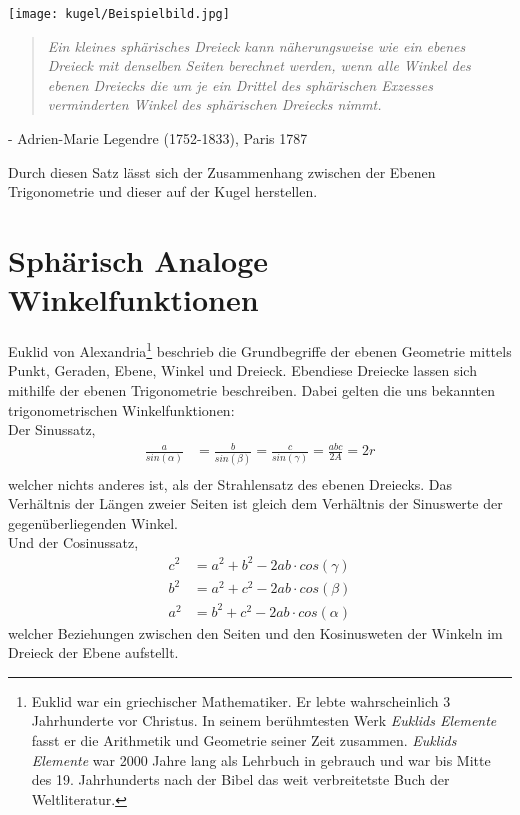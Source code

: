 \begin{refsection}
\begin{refsection}
\begin{center}
        \texttt{[image: kugel/Beispielbild.jpg]}
\end{center}

\begin{quote} \textit{Ein kleines sphärisches Dreieck kann näherungsweise 
wie ein ebenes Dreieck mit denselben Seiten berechnet 
werden, wenn alle Winkel des ebenen Dreiecks die um 
je ein Drittel des sphärischen Exzesses verminderten 
Winkel des sphärischen Dreiecks nimmt.} \end{quote}
\begin{flushright} - Adrien-Marie Legendre (1752-1833), Paris 1787
\end{flushright}

Durch diesen Satz lässt sich der Zusammenhang zwischen der Ebenen Trigonometrie und dieser auf der Kugel herstellen.



\section{Sphärisch Analoge Winkelfunktionen}
Euklid von Alexandria\footnote{%
Euklid war ein griechischer Mathematiker. Er lebte wahrscheinlich 3 Jahrhunderte vor Christus. In seinem berühmtesten Werk \textit{Euklids Elemente} fasst er die Arithmetik und Geometrie seiner Zeit zusammen. \textit{Euklids Elemente} war 2000 Jahre lang als Lehrbuch in gebrauch und war bis Mitte des 19. Jahrhunderts nach der Bibel das weit verbreitetste Buch der Weltliteratur.}  beschrieb die Grundbegriffe der ebenen Geometrie mittels Punkt, Geraden, Ebene, Winkel und Dreieck. Ebendiese Dreiecke lassen sich mithilfe der ebenen Trigonometrie beschreiben. Dabei gelten die uns bekannten trigonometrischen Winkelfunktionen:\\

Der Sinussatz,
\begin{align*}
\frac{ a }{ sin(\alpha) } &= \frac{ b }{sin(\beta)} = \frac{ c }{ sin(\gamma) } = \frac{abc}{2A} = 2r\\
\end{align*}
welcher nichts anderes ist, als der Strahlensatz des ebenen Dreiecks. Das Verhältnis der Längen zweier Seiten ist gleich dem Verhältnis der Sinuswerte der gegenüberliegenden Winkel.\\

Und der Cosinussatz,
\begin{align*}
c^{ 2 } &= a^{ 2 } + b^{ 2 } - 2ab\cdot cos(\gamma)\\
b^{ 2 } &= a^{ 2 } + c^{ 2 } - 2ab\cdot cos(\beta)\\
a^{ 2 } &= b^{ 2 } + c^{ 2 } - 2ab\cdot cos(\alpha)
\end{align*}
welcher Beziehungen zwischen den Seiten und den Kosinusweten der Winkeln im Dreieck der Ebene aufstellt.\\


\end{refsection}
\end{refsection}
